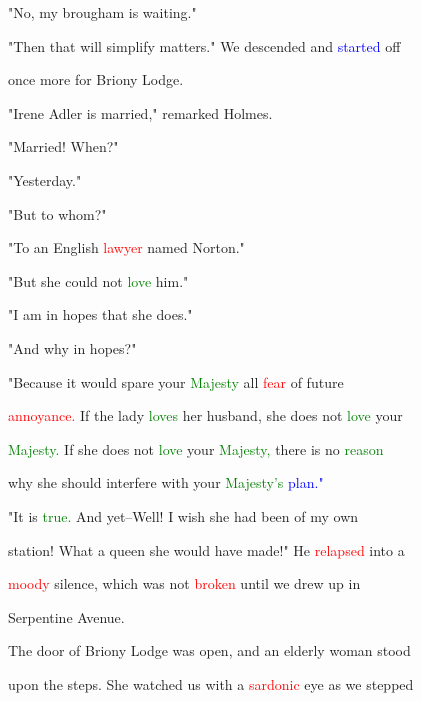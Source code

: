  "No, my brougham is \textcolor{BurntOrange}{waiting."}



 "Then that will \textcolor{BurntOrange}{simplify} matters." We descended and \textcolor{blue}{started} off

 once more for Briony Lodge.



 "Irene Adler is married," remarked Holmes.



 "Married! When?"



 "Yesterday."



 "But to whom?"



 "To an English \textcolor{red}{lawyer} named Norton."



 "But she could not \textcolor{green}{love} him."



 "I am in \textcolor{BurntOrange}{hopes} that she does."



 "And why in \textcolor{BurntOrange}{hopes?"}



 "Because it would spare your \textcolor{green}{Majesty} all \textcolor{red}{fear} of future

 \textcolor{red}{annoyance.} If the lady \textcolor{green}{loves} her husband, she does not \textcolor{green}{love} your

 \textcolor{green}{Majesty.} If she does not \textcolor{green}{love} your \textcolor{green}{Majesty,} there is no \textcolor{green}{reason}

 why she should interfere with your \textcolor{green}{Majesty's} \textcolor{blue}{plan."}



 "It is \textcolor{green}{true.} And yet--Well! I wish she had been of my own

 station! What a queen she would have made!" He \textcolor{red}{relapsed} into a

 \textcolor{red}{moody} silence, which was not \textcolor{red}{broken} until we drew up in

 Serpentine Avenue.



 The door of Briony Lodge was open, and an elderly woman stood

 upon the steps. She \textcolor{BurntOrange}{watched} us with a \textcolor{red}{sardonic} eye as we stepped

